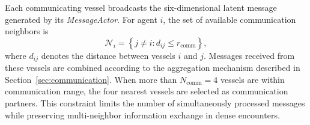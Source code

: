 \documentclass[final,5p,times,twocolumn]{elsarticle}
\begin{document}
{Each communicating vessel broadcasts the six-dimensional latent message
generated by its \textit{MessageActor}. For agent $i$, the set of
available communication neighbors is
\begin{equation}
\mathcal{N}_i
=
\left\{
j\neq i :
d_{ij}\leq r_{\mathrm{comm}}
\right\},
\end{equation}
where $d_{ij}$ denotes the distance between vessels $i$ and $j$.
Messages received from these vessels are combined according to the
aggregation mechanism described in Section~\ref{sec:communication}.
When more than $N_{\mathrm{comm}}=4$ vessels are within communication
range, the four nearest vessels are selected as communication partners.
This constraint limits the number of simultaneously processed messages
while preserving multi-neighbor information exchange in dense
encounters.
}
\end{document}
